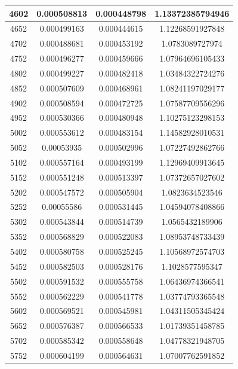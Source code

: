 \documentclass{article}
\begin{document}
\begin{longtable}{|c|c|c|c|}
		4602	&   0.000508813	  & 0.000448798	 &  1.13372385794946   \\ \hline
		4652	&   0.000499163	  & 0.000444615	 &  1.12268591927848   \\ \hline
		4702	&   0.000488681	  & 0.000453192	 &  1.0783089727974   \\ \hline
		4752	&   0.000496277	  & 0.000459666	 &  1.07964696105433   \\ \hline
		4802	&   0.000499227	  & 0.000482418	 &  1.03484322724276   \\ \hline
		4852	&   0.000507609	  & 0.000468961	 &  1.08241197029177   \\ \hline
		4902	&   0.000508594	  & 0.000472725	 &  1.07587709556296   \\ \hline
		4952	&   0.000530366	  & 0.000480948	 &  1.10275123298153   \\ \hline
		5002	&   0.000553612	  & 0.000483154	 &  1.14582928010531   \\ \hline
		5052	&   0.00053935	  & 0.000502996	 &  1.07227492862766   \\ \hline
		5102	&   0.000557164	  & 0.000493199	 &  1.12969409913645   \\ \hline
		5152	&   0.000551248	  & 0.000513397	 &  1.07372657027602   \\ \hline
		5202	&   0.000547572	  & 0.000505904	 &  1.0823634523546   \\ \hline
		5252	&   0.00055586	  & 0.000531445	 &  1.04594078408866   \\ \hline
		5302	&   0.000543844	  & 0.000514739	 &  1.0565432189906   \\ \hline
		5352	&   0.000568829	  & 0.000522083	 &  1.08953748733439   \\ \hline
		5402	&   0.000580758	  & 0.000525245	 &  1.10568972574703   \\ \hline
		5452	&   0.000582503	  & 0.000528176	 &  1.1028577595347   \\ \hline
		5502	&   0.000591532	  & 0.000555758	 &  1.06436974366541   \\ \hline
		5552	&   0.000562229	  & 0.000541778	 &  1.03774793365548   \\ \hline
		5602	&   0.000569521	  & 0.000545981	 &  1.04311505345424   \\ \hline
		5652	&   0.000576387	  & 0.000566533	 &  1.01739351458785   \\ \hline
		5702	&   0.000585342	  & 0.000558648	 &  1.04778321948705   \\ \hline
		5752	&   0.000604199	  & 0.000564631	 &  1.07007762591852   \\ \hline

\end{longtable}
\end{document}

